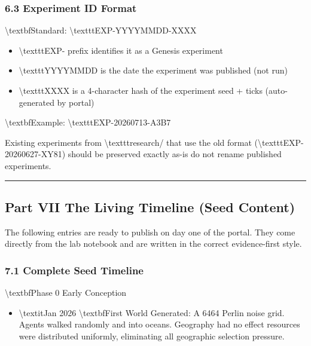 \documentclass[11pt,a4paper]{article}
\begin{document}
\subsubsection*{6.3 Experiment ID Format}

\textbackslash{}textbf{Standard:} \textbackslash{}texttt{EXP-YYYYMMDD-XXXX}

\begin{itemize}
  \item \textbackslash{}texttt{EXP-} prefix identifies it as a Genesis experiment
  \item \textbackslash{}texttt{YYYYMMDD} is the date the experiment was published (not run)
  \item \textbackslash{}texttt{XXXX} is a 4-character hash of the experiment seed + ticks (auto-generated by portal)
\end{itemize}

\textbackslash{}textbf{Example:} \textbackslash{}texttt{EXP-20260713-A3B7}

Existing experiments from \textbackslash{}texttt{research/} that use the old format (\textbackslash{}texttt{EXP-20260627-XY81}) should be preserved exactly as-is  do not rename published experiments.

\noindent\rule{\textwidth}{0.4pt}

\subsection*{Part VII  The Living Timeline (Seed Content)}

The following entries are ready to publish on day one of the portal. They come directly from the lab notebook and are written in the correct evidence-first style.

\subsubsection*{7.1 Complete Seed Timeline}

\textbackslash{}textbf{Phase 0  Early Conception}
\begin{itemize}
  \item \textbackslash{}textit{Jan 2026}  \textbackslash{}textbf{First World Generated}: A 6464 Perlin noise grid. Agents walked randomly and into oceans. Geography had no effect  resources were distributed uniformly, eliminating all geographic selection pressure.
\end{itemize}
\end{document}
